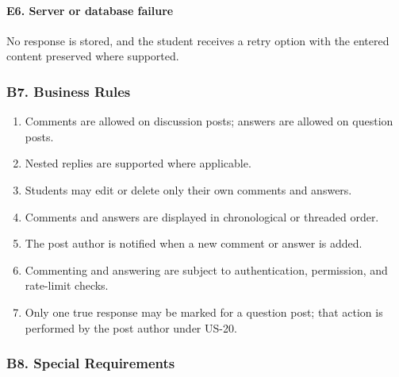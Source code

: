 \documentclass[12pt]{article}
\begin{document}
\hypertarget{sec:e6-server-or-database-failure}{}
\paragraph*{E6. Server or database failure}
\par\medskip

No response is stored, and the student receives a retry option with the entered content preserved where supported.
\par\medskip

\hypertarget{sec:b7-business-rules}{}
\subsubsection*{B7. Business Rules}
\par\medskip

\begin{enumerate}
\item Comments are allowed on discussion posts; answers are allowed on question posts.
\item Nested replies are supported where applicable.
\item Students may edit or delete only their own comments and answers.
\item Comments and answers are displayed in chronological or threaded order.
\item The post author is notified when a new comment or answer is added.
\item Commenting and answering are subject to authentication, permission, and rate-limit checks.
\item Only one true response may be marked for a question post; that action is performed by the post author under US-20.
\end{enumerate}
\par\medskip

\hypertarget{sec:b8-special-requirements}{}
\subsubsection*{B8. Special Requirements}
\par\medskip
\end{document}
